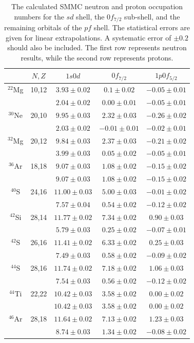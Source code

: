 \begin{table}%
\begin{center}
\caption{The calculated SMMC neutron and
proton occupation numbers for the $sd$ shell, the
$0f_{7/2}$ sub-shell, and the remaining orbitals of the
$pf$ shell.  The statistical errors are given for linear
extrapolations. A systematic error of $\pm 0.2$ should also
be included. The first row represents neutron results, while the 
second row represents protons.}
\renewcommand{\arraystretch}{1.2}
\begin{tabular}{|ccccc|}\hline
 & $N,Z$ & $1s0d$ & $0f_{7/2}$ & $1p0f_{5/2}$\\ \hline
$^{22}$Mg & 10,12 & $3.93 \pm 0.02$ & $0.1 \pm  0.02$ &
  $-0.05 \pm 0.01$ \\ &&  $2.04 \pm 0.02$ & $0.00 \pm 0.01$ &
  $-0.05 \pm 0.01$ \\
$^{30}$Ne & 20,10 & $9.95 \pm 0.03$ & $2.32 \pm 0.03$ &
  $-0.26 \pm 0.02$ \\ && $2.03 \pm 0.02$ & $-0.01 \pm 0.01$ &
  $-0.02 \pm 0.01$ \\
$^{32}$Mg & 20,12 & $9.84 \pm 0.03$ & $ 2.37 \pm 0.03$ &
  $-0.21 \pm 0.02$ \\ && $3.99 \pm 0.03$ & $0.05 \pm 0.02$ &
  $-0.05 \pm 0.01$ \\
$^{36}$Ar & 18,18 & $9.07 \pm 0.03$ & $1.08 \pm 0.02$ &
  $-0.15 \pm 0.02$ \\ && $9.07 \pm 0.03$ & $1.08 \pm 0.02$ &
  $-0.15 \pm 0.02$ \\
$^{40}$S & 24,16 & $11.00 \pm 0.03$ & $ 5.00 \pm 0.03 $ &
  $-0.01\pm 0.02$ \\ && $7.57 \pm 0.04$ & $0.54 \pm 0.02$ &
  $-0.12 \pm 0.02$ \\
$^{42}$Si & 28,14 & $11.77 \pm 0.02$ & $7.34 \pm 0.02$ &
  $0.90 \pm 0.03$ \\ && $5.79 \pm 0.03$ & $0.25 \pm 0.02$ &
  $-0.07 \pm 0.01$ \\
$^{42}$S & 26,16 & $11.41 \pm 0.02$ & $6.33 \pm 0.02$ &
  $0.25 \pm 0.03$ \\ && $7.49 \pm 0.03$ & $0.58 \pm 0.02$ &
  $-0.09 \pm 0.02$ \\
$^{44}$S & 28,16 & $11.74 \pm 0.02$ & $7.18 \pm 0.02$ &
  $1.06 \pm 0.03$ \\ && $7.54 \pm 0.03$ & $0.56 \pm 0.02$ &
  $-0.12 \pm 0.02$ \\
$^{44}$Ti & 22,22 & $10.42 \pm 0.03$ & $3.58 \pm 0.02$ &
  $0.00 \pm 0.02$\\ & & $10.42 \pm 0.03$ & $3.58 \pm 0.02$ &
  $0.00 \pm 0.02$ \\
$^{46}$Ar & 28,18 & $11.64 \pm 0.02$ & $7.13 \pm 0.02$ &
  $1.23 \pm 0.03$ \\ && $8.74 \pm 0.03$ & $1.34 \pm 0.02$ &
  $-0.08 \pm 0.02$ \\\hline
\end{tabular}
\end{center}
\label{Morten:t:tab3}
\end{table}


